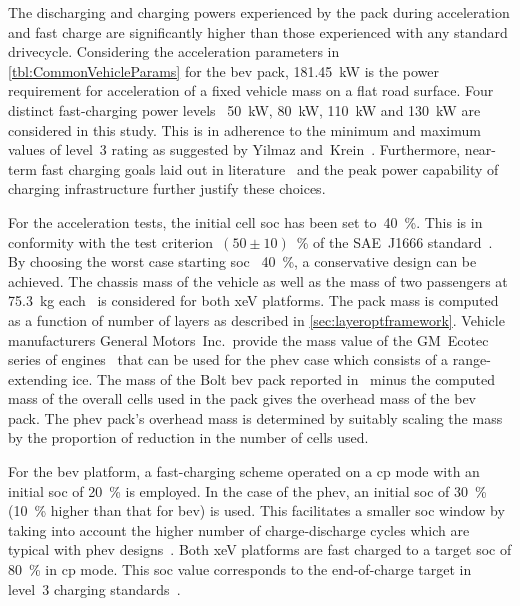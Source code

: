 The   discharging  and   charging  powers   experienced  by   the  pack   during
acceleration and  fast charge  are significantly  higher than  those experienced
with  any  standard  drivecycle.  Considering  the  acceleration  parameters  in
\cref{tbl:CommonVehicleParams} for  the \gls{bev}  pack, \SI{181.45}{\kilo\watt}
is   the  power   requirement  for   acceleration  of   a  fixed   vehicle  mass
on   a   flat  road   surface.   Four   distinct  fast-charging   power   levels
\viz~\SI{50}{\kilo\watt},   \SI{80}{\kilo\watt},  \SI{110}{\kilo\watt}   and
\SI{130}{\kilo\watt}  are considered  in this  study.  This is  in adherence  to
the  minimum  and maximum  values  of  level~3  rating  as suggested  by  Yilmaz
and~Krein~\cite{Yilmaz2012}. Furthermore, near-term fast charging goals laid out
in  literature~\cite{Ashique2017,Srdic2016} and  the  peak  power capability  of
charging infrastructure further justify these choices.



For  the   acceleration  tests,  the   initial  cell  \gls{soc}  has   been  set
to~\SI{40}{\percent}.  This is  in conformity  with the  test criterion~${(50\pm
10)}$~\%  of  the  SAE~J1666  standard~\cite{Sae2010}.  By  choosing  the  worst
case  starting \gls{soc}  \ie~\SI{40}{\percent},  a conservative  design can  be
achieved.  The  chassis  mass  of  the  vehicle as  well  as  the  mass  of  two
passengers at  \SI{75.3}{\kilogram} each~\cite{Sae2010}  is considered  for both
\gls{xeV}  platforms. The  pack mass  is  computed as  a function  of number  of
layers  as  described  in  \cref{sec:layeroptframework}.  Vehicle  manufacturers
General  Motors~Inc.\,  provide  the  mass  value of  the  GM~Ecotec  series  of
engines~\cite{motortrendEcotec} that can  be used for the  \gls{phev} case which
consists of  a range-extending \gls{ice}.  The mass  of the Bolt  \gls{bev} pack
reported in~\cite{ChevyBoltSpecs} minus  the computed mass of  the overall cells
used in the pack  gives the overhead mass of the  \gls{bev} pack. The \gls{phev}
pack's  overhead  mass  is  determined  by suitably  scaling  the  mass  by  the
proportion of reduction in the number of cells used.


For the \gls{bev}  platform, a fast-charging scheme operated on  a \gls{cp} mode
with an initial  \gls{soc} of \SI{20}{\percent} is employed. In  the case of the
\gls{phev}, an initial \gls{soc}  of \SI{30}{\percent} (\SI{10}{\percent} higher
than that for \gls{bev}) is used. This facilitates a smaller \gls{soc} window by
taking  into account  the higher  number  of charge-discharge  cycles which  are
typical with \gls{phev}  designs~\cite{Maksimovic2012}. Both \gls{xeV} platforms
are fast  charged to a target  \gls{soc} of \SI{80}{\percent} in  \gls{cp} mode.
This \gls{soc} value corresponds to the end-of-charge target in level~3 charging
standards~\cite{SAECharging2011}.

